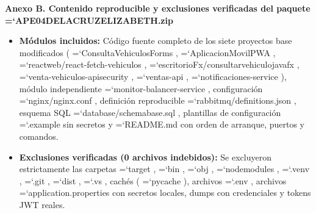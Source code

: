 \documentclass[11pt,a4paper]{article}
\renewcommand{\_}{\oldunderscore\allowbreak}
\DeclareRobustCommand{\texttt}[1]{%
  {\upshape\ttfamily\fontsize{9}{10.8}\selectfont\hyphenchar\font=`\-\relax #1}%
}
\begin{document}
\vspace{0.1cm}
\noindent\textbf{Anexo B. Contenido reproducible y exclusiones verificadas del paquete \texttt{APE04\_DELACRUZ\_ELIZABETH.\allowbreak{}zip}}
\begin{itemize}[leftmargin=*,itemsep=2pt,topsep=1pt]
  \item \textbf{Módulos incluidos:} Código fuente completo de los siete proyectos base modificados (\texttt{ConsultaVehiculosForms}, \texttt{AplicacionMovilPWA}, \texttt{reactweb/\allowbreak{}react-fetch-vehiculos}, \texttt{escritorioFx/\allowbreak{}consultarvehiculojavafx}, \texttt{venta-vehiculos-api\_security}, \texttt{ventas-api}, \texttt{notificaciones-service}), módulo independiente \texttt{monitor-balancer-service}, configuración \texttt{nginx/\allowbreak{}nginx.\allowbreak{}conf}, definición reproducible \texttt{rabbitmq/\allowbreak{}definitions.\allowbreak{}json}, esquema SQL \texttt{database/\allowbreak{}schema\_base.\allowbreak{}sql}, plantillas de configuración \texttt{.example} sin secretos y \texttt{README.md} con orden de arranque, puertos y comandos.
  \item \textbf{Exclusiones verificadas (0 archivos indebidos):} Se excluyeron estrictamente las carpetas \texttt{target}, \texttt{bin}, \texttt{obj}, \texttt{node\_modules}, \texttt{.venv}, \texttt{.git}, \texttt{dist}, \texttt{.vs}, cachés (\texttt{\_\_pycache\_\_}), archivos \texttt{.env}, archivos \texttt{application.\allowbreak{}properties} con secretos locales, dumps con credenciales y tokens JWT reales.
\end{itemize}
\end{document}
